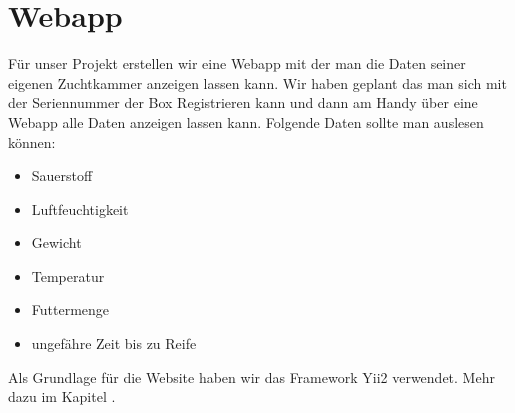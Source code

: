 \def \currentAuthor {Florian Tipotsch}

\section{Webapp}

Für unser Projekt erstellen wir eine Webapp mit der man die Daten seiner eigenen Zuchtkammer anzeigen lassen kann.
Wir haben geplant das man sich mit der Seriennummer der Box Registrieren kann und dann am Handy über eine Webapp alle Daten anzeigen lassen kann. Folgende Daten sollte man auslesen können:

\begin{itemize}
	\item Sauerstoff
	\item Luftfeuchtigkeit
	\item Gewicht
	\item Temperatur
	\item Futtermenge
	\item ungefähre Zeit bis zu Reife
\end{itemize}
Als Grundlage für die Website haben wir das Framework Yii2 verwendet. Mehr dazu im Kapitel .

